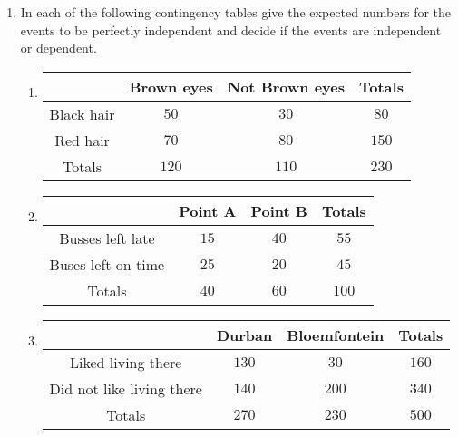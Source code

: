 \begin{eocexercises}{}
\begin{enumerate}
\item In each of the following contingency tables give the expected numbers for the events to be perfectly independent and decide if the events are independent or dependent.
	\begin{enumerate}
	\item \begin{center}
\begin{tabular}{|c|c|c|c|}
\hline
           & Brown eyes & Not Brown eyes & Totals \\
\hline
Black hair & $50$         & $30$             & $80 $    \\
Red hair   & $70$         & $80$             & $150 $   \\
\hline
Totals     & $120$        & $110 $           & $230 $   \\
\hline
\end{tabular}
\end{center}

	\item \begin{center}
\begin{tabular}{|c|c|c|c|}
\hline
                    & Point A & Point B & Totals \\
\hline
Busses left late    & $15$      & $40$      & $55$     \\
Buses left on time & $25$      & $20 $     & $45$     \\
\hline
Totals              & $40 $     & $60$      & $100$    \\
\hline
\end{tabular}
\end{center}

	\item \begin{center}
\begin{tabular}{|c|c|c|c|}
\hline
                          & Durban & Bloemfontein & Totals \\
\hline
Liked living there        & $130$    & $30 $          & $160$    \\
Did not like living there & $140 $   & $200 $         & $340$    \\
\hline
Totals                    & $270$   &$ 230 $         & $500$    \\
\hline
\end{tabular}
\end{center}


\end{enumerate}
\end{enumerate}
\end{eocexercises}

